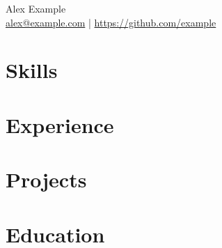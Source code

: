 \documentclass[11pt]{article}
\begin{document}
\begin{center}
{\LARGE Alex Example}\\
\small \href{mailto:alex@example.com}{alex@example.com} \;|\; \url{https://github.com/example}\\
\end{center}

\section*{Skills}


\section*{Experience}


\section*{Projects}


\section*{Education}

\end{document}
